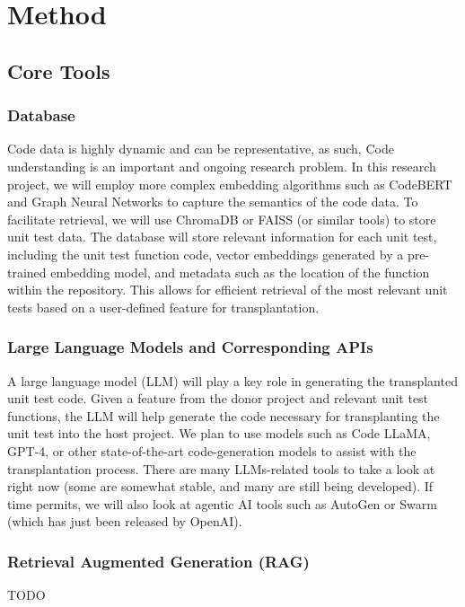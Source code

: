 \documentclass[sigconf]{acmart}
\begin{document}
\section{Method}
\subsection{Core Tools}
\subsubsection{Database}
Code data is highly dynamic and can be representative, as such, Code understanding is an important and ongoing research problem. In this research project, we will employ more complex embedding algorithms such as CodeBERT and Graph Neural Networks to capture the semantics of the code data. To facilitate retrieval, we will use ChromaDB or FAISS (or similar tools) to store unit test data. The database will store relevant information for each unit test, including the unit test function code, vector embeddings generated by a pre-trained embedding model, and metadata such as the location of the function within the repository. This allows for efficient retrieval of the most relevant unit tests based on a user-defined feature for transplantation.

\subsubsection{Large Language Models and Corresponding APIs}
A large language model (LLM) will play a key role in generating the transplanted unit test code. Given a feature from the donor project and relevant unit test functions, the LLM will help generate the code necessary for transplanting the unit test into the host project. We plan to use models such as Code LLaMA, GPT-4, or other state-of-the-art code-generation models to assist with the transplantation process. There are many LLMs-related tools to take a look at right now (some are somewhat stable, and many are still being developed). If time permits, we will also look at agentic AI tools such as AutoGen or Swarm (which has just been released by OpenAI).

\subsubsection{Retrieval Augmented Generation (RAG)}
TODO
\end{document}
